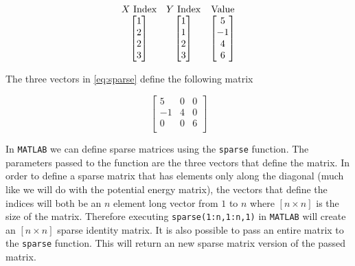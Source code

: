 \documentclass[authoryearcitations]{UoYCSproject}
\begin{document}
\begin{equation}
\begin{array}{c c c}
X\text{ Index} & Y\text{ Index} & \text{Value} \\
\begin{bmatrix} 
                1 \\
                2 \\
                2 \\
                3 \\ \end{bmatrix} & \begin{bmatrix}          
                                           1 \\
                                           1 \\
                                           2 \\
                                           3 \\ \end{bmatrix} & \begin{bmatrix}
                                                                        5 \\
                                                                        -1 \\
                                                                         4 \\
                                                                          6 \\
                                                                \end{bmatrix}
\end{array}
\label{eq:sparse}
\end{equation}

The three vectors in \ref{eq:sparse} define the following matrix

\begin{equation}
\begin{bmatrix}
5   & 0  & 0 \\ 
-1  & 4  & 0 \\
 0  & 0  & 6 \\
\end{bmatrix}
\end{equation}

In \verb+MATLAB+ we can define sparse matrices using the \verb+sparse+ function. The parameters passed to the function
are the three vectors that define the matrix. 
In order to define a sparse matrix that has elements only along the diagonal (much like we will do with the potential
energy matrix), the vectors that define the indices will both be an $n$ element long vector from $1$ to $n$ where $[n \times n]$
is the size of the matrix. Therefore executing \verb+sparse(1:n,1:n,1)+ in \verb+MATLAB+ will create an $[n \times n]$ sparse
identity matrix. It is also possible to pass an entire matrix to the \verb+sparse+ function. This will return an new sparse
matrix version of the passed matrix. 
\end{document}
